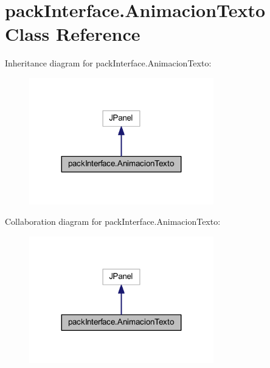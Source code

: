 \hypertarget{classpack_interface_1_1_animacion_texto}{}\section{pack\+Interface.\+Animacion\+Texto Class Reference}
\label{classpack_interface_1_1_animacion_texto}


Inheritance diagram for pack\+Interface.\+Animacion\+Texto\+:
\nopagebreak
\begin{figure}[H]
\begin{center}
\leavevmode
\includegraphics[width=227pt]{classpack_interface_1_1_animacion_texto__inherit__graph}
\end{center}
\end{figure}


Collaboration diagram for pack\+Interface.\+Animacion\+Texto\+:
\nopagebreak
\begin{figure}[H]
\begin{center}
\leavevmode
\includegraphics[width=227pt]{classpack_interface_1_1_animacion_texto__coll__graph}
\end{center}
\end{figure}
